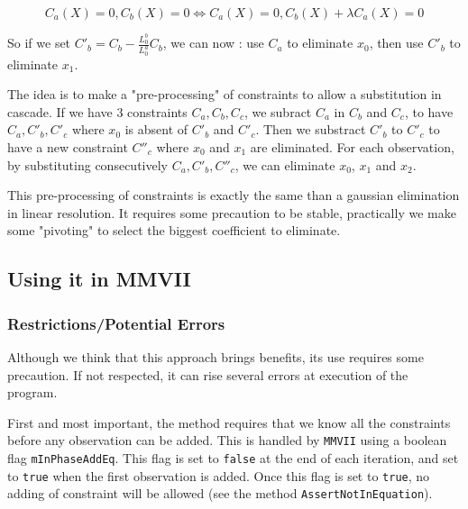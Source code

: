 \begin{equation}
    C_a(X)=0  , C_b(X)=0   \Leftrightarrow  C_a(X)=0  , C_b(X)+\lambda C_a(X) =0
\end{equation}

So if we set $C'_b = C_b - \frac{L^b_0}{L^a_0} C_b$, we can now : use $C_a$ to eliminate $x_0$,
then use $C'_b$ to eliminate $x_1$. 

The idea is to make a "pre-processing" of constraints to allow a substitution in cascade.
If we have $3$ constraints $C_a, C_b, C_c$, we subract $C_a$ in $C_b$ and $C_c$, to have $C_a, C'_b, C'_c$
where $x_0$ is absent of $C'_b$ and $C'_c$. Then we substract  $C'_b$ to $C'_c$ to have a new constraint 
$C''_c$ where  $x_0$ and $x_1$ are eliminated.  For each observation, by substituting consecutively $C_a,C'_b,C''_c$, we can eliminate
$x_0$, $x_1$ and $x_2$.

This pre-processing of constraints is exactly the same than a gaussian elimination in linear resolution.
It requires some precaution to be stable, practically we make some "pivoting" to select the biggest coefficient
to eliminate.


\subsection{Using it in MMVII}

\label{Cstr:Use:MMVII}


\subsubsection{Restrictions/Potential Errors}

Although we think that this approach brings benefits, its use requires some precaution.
If not respected, it can rise several errors at execution of the program.

First and most important, the method requires that we know all the constraints
before any observation can be added.  This is handled by {\tt MMVII} using a boolean flag {\tt mInPhaseAddEq}.
This flag is set to {\tt false}  at the end of each iteration, and set to {\tt true} when
the first observation is added.  Once this flag is set to {\tt true}, no adding of constraint
will be allowed (see the method {\tt AssertNotInEquation}).

